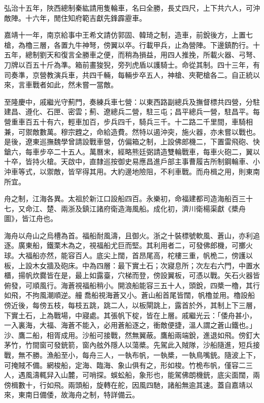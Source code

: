 弘治十五年，陜西總制秦紘請用隻輪車，名曰全勝，長丈四尺，上下共六人，可沖敵陣。十六年，閒住知府範吉獻先鋒霹靂車。

嘉靖十一年，南京給事中王希文請仿郭固、韓琦之制，造車，前銳後方，上置七槍，為櫓三層，各置九牛神弩，傍翼以卒。行載甲兵，止為營陣。下邊鎮酌行。十五年，總制劉天和復言全勝車之便，而稍為損益，用四人推挽，所載火器、弓弩、刀牌以百五十斤為準。箱前畫狻猊，旁列虎盾以護騎士。命從其制。四十三年，有司奏準，京營教演兵車，共四千輛，每輛步卒五人，神槍、夾靶槍各二。自正統以來，言車戰者如此，然未嘗一當敵。

至隆慶中，戚繼光守薊門，奏練兵車七營：以東西路副總兵及撫督標共四營，分駐建昌、遵化、石匣、密雲；薊、遼總兵二營，駐三屯；昌平總兵一營，駐昌平。每營重車百五十有六，輕車加百，步兵四千，騎兵三千。十二路二千里間，車騎相兼，可禦敵數萬。穆宗韙之，命給造費。然特以遏沖突，施火器，亦未嘗以戰也。是後，遼東巡撫魏學曾請設戰車營，仿偏箱之制，上設佛郎機二，下置雷飛砲、快鎗六，每車步卒二十五人。萬曆末，經略熊廷弼請造雙輪戰車，每車火砲二，翼以十卒，皆持火槍。天啟中，直隸巡按御史易應昌進戶部主事曹履吉所制鋼輪車、小沖車等式，以禦敵，皆罕得其用。大約邊地險阻，不利車戰。而舟楫之用，則東南所宜。

舟之制，江海各異。太祖於新江口設船四百。永樂初，命福建都司造海船百三十七，又命江、楚、兩浙及鎮江諸府衛造海風船。成化初，濟川衛楊渠獻《槳舟圖》，皆江舟也。

海舟以舟山之烏槽為首。福船耐風濤，且御火。浙之十裝標號軟風、蒼山，亦利追逐。廣東船，鐵栗木為之，視福船尤巨而堅。其利用者二，可發佛郎機，可擲火球。大福船亦然，能容百人。底尖上闊，首昂尾高，柁樓三重，帆桅二，傍護以板，上設木女牆及砲床。中為四層：最下實土石；次寢息所；次左右六門，中置水櫃，揚帆炊爨皆在是，最上如露臺，穴梯而登，傍設翼板，可憑以戰。矢石火器皆俯發，可順風行。海蒼視福船稍小。開浪船能容三五十人，頭銳，四槳一櫓，其行如飛，不拘風潮順逆。艟喬船視海蒼又小。蒼山船首尾皆闊，帆櫓並用。櫓設船傍近後，每傍五枝，每枝五跳，跳二人，以板閘跳上，露首於外，其制上下三層，下實土石，上為戰場，中寢處。其張帆下椗，皆在上層。戚繼光云：「倭舟甚小，一入裏海，大福、海蒼不能入，必用蒼船逐之，衝敵便捷，溫人謂之蒼山鐵也。」沙、鷹二船，相胥成用。沙船可接戰，然無翼蔽。鷹船兩端銳，進退如飛。傍釘大茅竹，竹間窗可發銃箭，窗內舷外隱人以蕩槳。先駕此入賊隊，沙船隨進，短兵接戰，無不勝。漁船至小，每舟三人，一執布帆，一執槳，一執鳥嘴銃。隨波上下，可掩賊不備。網梭船，定海、臨海、象山俱有之，形如梭。竹桅布帆，僅容二三人，遇風濤輒舁入山麓，可哨探。蜈蚣船，象形也，能駕佛朗機銃，底尖面闊，兩傍楫數十，行如飛。兩頭船，旋轉在舵，因風四馳，諸船無逾其速。蓋自嘉靖以來，東南日備倭，故海舟之制，特詳備云。

